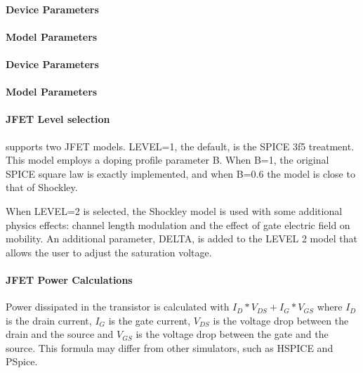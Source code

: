 \pagebreak

\paragraph{Device Parameters}


\paragraph{Model Parameters}


\pagebreak

\paragraph{Device Parameters}


\paragraph{Model Parameters}


\paragraph{JFET Level selection}
\Xyce{} supports two JFET models.  LEVEL=1, the default, is the SPICE 3f5
treatment.  This model employs a doping profile parameter B.  When B=1,
the original SPICE square law is exactly implemented, and when B=0.6 the
model is close to that of Shockley.

When LEVEL=2 is selected, the Shockley model is used with some additional physics
effects:  channel length modulation and the effect of gate electric field on
mobility.  An additional parameter, DELTA, is added to the LEVEL 2 model that
allows the user to adjust the saturation voltage.

\paragraph{JFET Power Calculations}
Power dissipated in the transistor is calculated with $I_{D}*V_{DS}+I_{G}*V_{GS}$ where
$I_{D}$ is the drain current, $I_{G}$ is the gate current, $V_{DS}$ is the 
voltage drop between the drain and the source and $V_{GS}$ is the voltage drop 
between the gate and the source. This formula may differ from other simulators,
such as HSPICE and PSpice.
